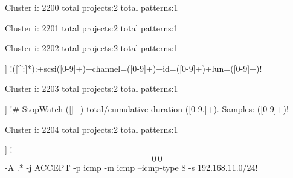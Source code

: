 Cluster i: 2200
total projects:2
total patterns:1
\begin{multicols}{1}
\end{multicols}







Cluster i: 2201
total projects:2
total patterns:1
\begin{multicols}{1}
\end{multicols}







Cluster i: 2202
total projects:2
total patterns:1
\begin{multicols}{1}
\begin{description}[noitemsep,topsep=0pt]
\item [[2] ] \cverb!([^:]*):\s+scsi([0-9]+)\s+channel=([0-9]+)\s+id=([0-9]+)\s+lun=([0-9]+)!
\end{description}
\end{multicols}







Cluster i: 2203
total projects:2
total patterns:1
\begin{multicols}{1}
\begin{description}[noitemsep,topsep=0pt]
\item [[2] ] \cverb!# StopWatch ([\w]+) total/cumulative duration ([0-9.]+). Samples: ([0-9]+)!
\end{description}
\end{multicols}







Cluster i: 2204
total projects:2
total patterns:1
\begin{multicols}{1}
\begin{description}[noitemsep,topsep=0pt]
\item [[2] ] \cverb!\[0\:0\] -A .* -j ACCEPT -p icmp -m icmp --icmp-type 8 -s 192.168.11.0/24!
\end{description}
\end{multicols}







